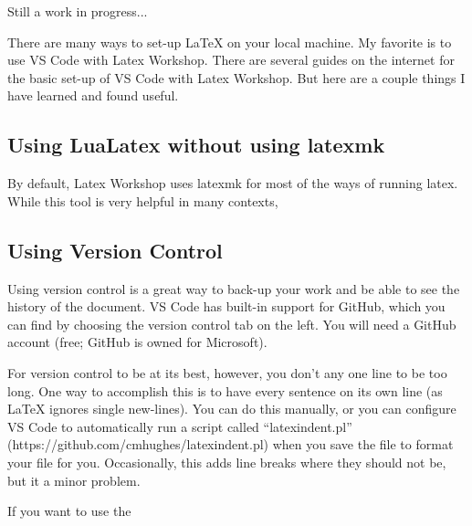 \documentclass{article}
\begin{document}
Still a work in progress...

There are many ways to set-up LaTeX on your local machine.
My favorite is to use VS Code with Latex Workshop.
There are several guides on the internet for the basic set-up of VS Code with Latex Workshop.
But here are a couple things I have learned and found useful.

\subsection{Using LuaLatex without using latexmk}
By default, Latex Workshop uses latexmk for most of the ways of running latex. While this tool is very helpful in many contexts,

\subsection{Using Version Control}
Using version control is a great way to back-up your work and be able to see the history of the document.
VS Code has built-in support for GitHub, which you can find by choosing the version control tab on the left.
You will need a GitHub account (free; GitHub is owned for Microsoft).

For version control to be at its best, however, you don't any one line to be too long.
One way to accomplish this is to have every sentence on its own line (as LaTeX ignores single new-lines).
You can do this manually, or you can configure VS Code to automatically run a script called ``latexindent.pl'' (https://github.com/cmhughes/latexindent.pl) when you save the file to format your file for you. Occasionally, this adds line breaks where they should not be, but it a minor problem.

If you want to use the
\end{document}
